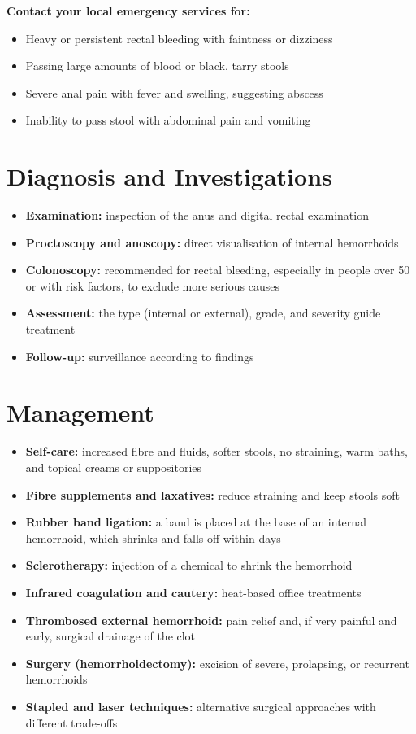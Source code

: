 \textbf{Contact your local emergency services for:}
\begin{itemize}
    \item Heavy or persistent rectal bleeding with faintness or dizziness
    \item Passing large amounts of blood or black, tarry stools
    \item Severe anal pain with fever and swelling, suggesting abscess
    \item Inability to pass stool with abdominal pain and vomiting
\end{itemize}

\section*{Diagnosis and Investigations}
\begin{itemize}
    \item \textbf{Examination:} inspection of the anus and digital rectal examination
    \item \textbf{Proctoscopy and anoscopy:} direct visualisation of internal hemorrhoids
    \item \textbf{Colonoscopy:} recommended for rectal bleeding, especially in people over 50 or with risk factors, to exclude more serious causes
    \item \textbf{Assessment:} the type (internal or external), grade, and severity guide treatment
    \item \textbf{Follow-up:} surveillance according to findings
\end{itemize}

\section*{Management}
\begin{itemize}
    \item \textbf{Self-care:} increased fibre and fluids, softer stools, no straining, warm baths, and topical creams or suppositories
    \item \textbf{Fibre supplements and laxatives:} reduce straining and keep stools soft
    \item \textbf{Rubber band ligation:} a band is placed at the base of an internal hemorrhoid, which shrinks and falls off within days
    \item \textbf{Sclerotherapy:} injection of a chemical to shrink the hemorrhoid
    \item \textbf{Infrared coagulation and cautery:} heat-based office treatments
    \item \textbf{Thrombosed external hemorrhoid:} pain relief and, if very painful and early, surgical drainage of the clot
    \item \textbf{Surgery (hemorrhoidectomy):} excision of severe, prolapsing, or recurrent hemorrhoids
    \item \textbf{Stapled and laser techniques:} alternative surgical approaches with different trade-offs
\end{itemize}


